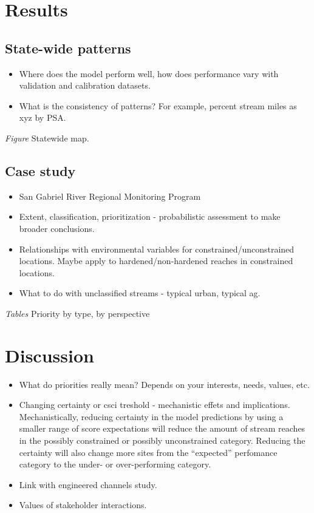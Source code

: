 \documentclass[]{article}
\begin{document}
\section{Results}\label{results}

\subsection{State-wide patterns}\label{state-wide-patterns}

\begin{itemize}
\item
  Where does the model perform well, how does performance vary with
  validation and calibration datasets.
\item
  What is the consistency of patterns? For example, percent stream miles
  as xyz by PSA.
\end{itemize}

\emph{Figure} Statewide map.

\subsection{Case study}\label{case-study}

\begin{itemize}
\item
  San Gabriel River Regional Monitoring Program
\item
  Extent, classification, prioritization - probabilistic assessment to
  make broader conclusions.
\item
  Relationships with environmental variables for
  constrained/unconstrained locations. Maybe apply to
  hardened/non-hardened reaches in constrained locations.
\item
  What to do with unclassified streams - typical urban, typical ag.
\end{itemize}

\emph{Tables} Priority by type, by perspective

\section{Discussion}\label{discussion}

\begin{itemize}
\item
  What do priorities really mean? Depends on your interests, needs,
  values, etc.
\item
  Changing certainty or \ac{csci} treshold - mechanistic effets and
  implications. Mechanistically, reducing certainty in the model
  predictions by using a smaller range of score expectations will reduce
  the amount of stream reaches in the possibly constrained or possibly
  unconstrained category. Reducing the certainty will also change more
  sites from the ``expected'' perfomance category to the under- or
  over-performing category.
\item
  Link with engineered channels study.
\item
  Values of stakeholder interactions.
\end{itemize}
\end{document}
